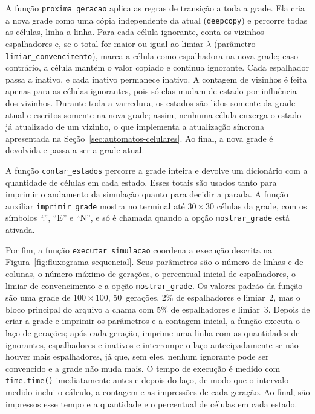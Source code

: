 A função \texttt{proxima\_geracao} aplica as regras de transição a toda a grade. Ela cria a nova grade como uma cópia independente da atual (\texttt{deepcopy}) e percorre todas as células, linha a linha. Para cada célula ignorante, conta os vizinhos espalhadores e, se o total for maior ou igual ao limiar $\lambda$ (parâmetro \texttt{limiar\_convencimento}), marca a célula como espalhadora na nova grade; caso contrário, a célula mantém o valor copiado e continua ignorante. Cada espalhador passa a inativo, e cada inativo permanece inativo. A contagem de vizinhos é feita apenas para as células ignorantes, pois só elas mudam de estado por influência dos vizinhos. Durante toda a varredura, os estados são lidos somente da grade atual e escritos somente na nova grade; assim, nenhuma célula enxerga o estado já atualizado de um vizinho, o que implementa a atualização síncrona apresentada na Seção~\ref{sec:automatos-celulares}. Ao final, a nova grade é devolvida e passa a ser a grade atual.

A função \texttt{contar\_estados} percorre a grade inteira e devolve um dicionário com a quantidade de células em cada estado. Esses totais são usados tanto para imprimir o andamento da simulação quanto para decidir a parada. A função auxiliar \texttt{imprimir\_grade} mostra no terminal até $30 \times 30$ células da grade, com os símbolos ``.'', ``E'' e ``N'', e só é chamada quando a opção \texttt{mostrar\_grade} está ativada.

Por fim, a função \texttt{executar\_simulacao} coordena a execução descrita na Figura~\ref{fig:fluxograma-sequencial}. Seus parâmetros são o número de linhas e de colunas, o número máximo de gerações, o percentual inicial de espalhadores, o limiar de convencimento e a opção \texttt{mostrar\_grade}. Os valores padrão da função são uma grade de $100 \times 100$, 50~gerações, 2\% de espalhadores e limiar~2, mas o bloco principal do arquivo a chama com 5\% de espalhadores e limiar~3. Depois de criar a grade e imprimir os parâmetros e a contagem inicial, a função executa o laço de gerações; após cada geração, imprime uma linha com as quantidades de ignorantes, espalhadores e inativos e interrompe o laço antecipadamente se não houver mais espalhadores, já que, sem eles, nenhum ignorante pode ser convencido e a grade não muda mais. O tempo de execução é medido com \texttt{time.time()} imediatamente antes e depois do laço, de modo que o intervalo medido inclui o cálculo, a contagem e as impressões de cada geração. Ao final, são impressos esse tempo e a quantidade e o percentual de células em cada estado.

